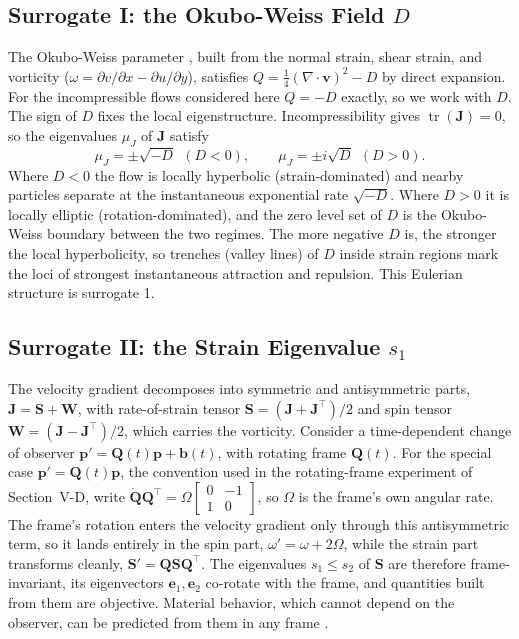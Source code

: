 \documentclass[lettersize,journal]{IEEEtran}
\begin{document}
\label{sec:separatrix}
\subsection{Surrogate I: the Okubo-Weiss Field $D$}

The Okubo-Weiss parameter \cite{29,30}, built from the normal strain,
shear strain, and vorticity
($\omega = \partial v/\partial x - \partial u/\partial y$), satisfies
$Q = \tfrac{1}{4}(\nabla \cdot \mathbf{v})^2 - D$ by direct expansion.
For the incompressible flows considered here $Q = -D$ exactly, so we
work with $D$. The sign of $D$ fixes the local eigenstructure.
Incompressibility gives $\operatorname{tr}(\mathbf{J}) = 0$, so the
eigenvalues $\mu_J$ of $\mathbf{J}$ satisfy
\begin{equation}
    \mu_J = \pm\sqrt{-D} \ \ (D < 0), \qquad
    \mu_J = \pm i\sqrt{D} \ \ (D > 0).
    \label{eq:eig_detj}
\end{equation}
Where $D < 0$ the flow is locally hyperbolic (strain-dominated) and
nearby particles separate at the instantaneous exponential rate
$\sqrt{-D}$. Where $D > 0$ it is locally elliptic (rotation-dominated),
and the zero level set of $D$ is the Okubo-Weiss boundary between the
two regimes. The more negative $D$ is, the stronger the local
hyperbolicity, so trenches (valley lines) of $D$ inside strain regions
mark the loci of strongest instantaneous attraction and repulsion. This
Eulerian structure is surrogate 1.

\subsection{Surrogate II: the Strain Eigenvalue $s_1$}
\label{sec:strain_field}

The velocity gradient decomposes into symmetric and antisymmetric
parts, $\mathbf{J} = \mathbf{S} + \mathbf{W}$, with rate-of-strain
tensor $\mathbf{S} = (\mathbf{J} + \mathbf{J}^\top)/2$ and spin tensor
$\mathbf{W} = (\mathbf{J} - \mathbf{J}^\top)/2$, which carries the
vorticity. Consider a time-dependent change of observer
$\mathbf{p}' = \mathbf{Q}(t)\mathbf{p} + \mathbf{b}(t)$, with rotating
frame $\mathbf{Q}(t)$. For the special case
$\mathbf{p}' = \mathbf{Q}(t)\mathbf{p}$, the convention used in the
rotating-frame experiment of Section~\mbox{V-D}, write
$\dot{\mathbf{Q}}\mathbf{Q}^\top = \Omega\left[\begin{smallmatrix} 0 &
-1 \\ 1 & 0 \end{smallmatrix}\right]$, so $\Omega$ is the frame's own
angular rate. The frame's rotation enters the velocity gradient only
through this antisymmetric term, so it lands entirely in the spin
part, $\omega' = \omega + 2\Omega$, while the strain part transforms
cleanly, $\mathbf{S}' = \mathbf{Q}\mathbf{S}\mathbf{Q}^\top$. The
eigenvalues $s_1 \leq s_2$ of $\mathbf{S}$ are therefore
frame-invariant, its eigenvectors $\mathbf{e}_1, \mathbf{e}_2$
co-rotate with the frame, and quantities built from them are
objective. Material behavior, which cannot depend on the observer, can
be predicted from them in any frame \cite{24,25}.
\end{document}

